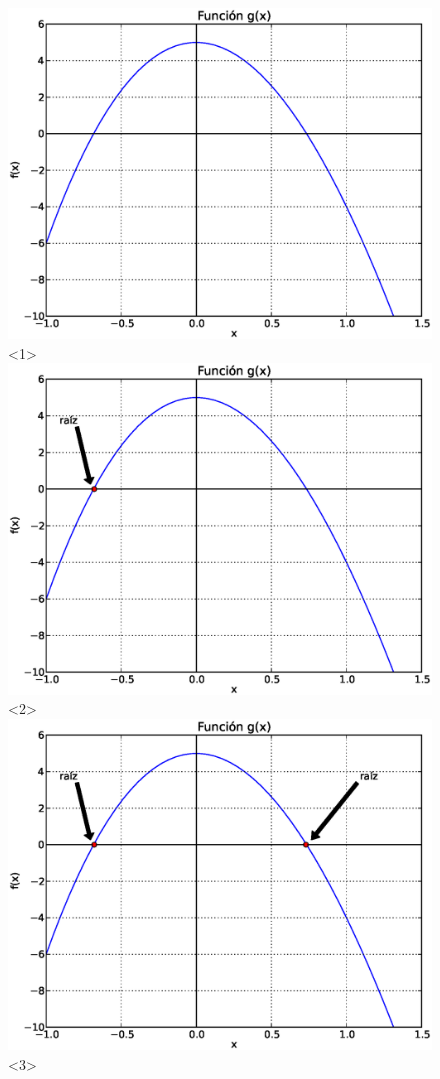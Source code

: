 \documentclass[12pt]{beamer}
\begin{document}
\begin{frame}[fragile]
\begin{figure}
	\centering
	\includegraphics[scale=0.45]{Sucesiones_01.eps}<1> 
	\includegraphics[scale=0.45]{Sucesiones_02.eps}<2>
	\includegraphics[scale=0.45]{Sucesiones_03.eps}<3>
\end{figure}
\end{frame}
\end{document}
